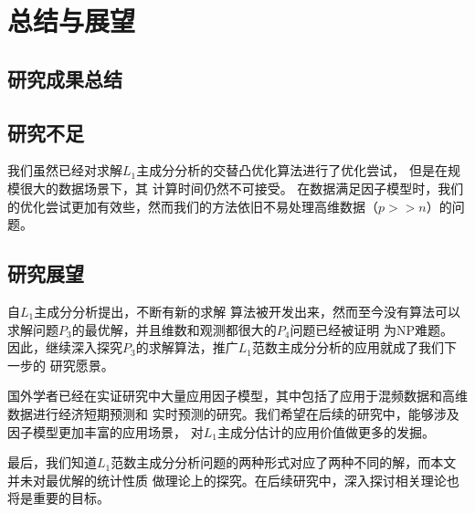 \section{总结与展望}

\subsection{研究成果总结}

\subsection{研究不足}
我们虽然已经对求解$L_1$主成分分析的交替凸优化算法进行了优化尝试，
但是在规模很大的数据场景下，其
计算时间仍然不可接受。
在数据满足因子模型时，我们的优化尝试更加有效些，然而我们的方法依旧不易处理高维数据（$p >> n$）的问题。

\subsection{研究展望}
自$L_1$主成分分析提出，不断有新的求解
算法被开发出来，然而至今没有算法可以求解问题$P_3$的最优解，并且维数和观测都很大的$P_4$问题已经被证明
为NP难题。
因此，继续深入探究$P_3$的求解算法，推广$L_1$范数主成分分析的应用就成了我们下一步的
研究愿景。

国外学者已经在实证研究中大量应用因子模型，其中包括了应用于混频数据和高维数据进行经济短期预测和
实时预测的研究。我们希望在后续的研究中，能够涉及因子模型更加丰富的应用场景，
对$L_1$主成分估计的应用价值做更多的发掘。

最后，我们知道$L_1$范数主成分分析问题的两种形式对应了两种不同的解，而本文并未对最优解的统计性质
做理论上的探究。在后续研究中，深入探讨相关理论也将是重要的目标。

